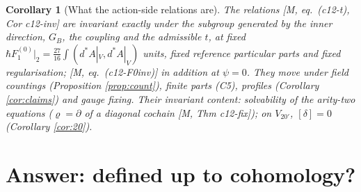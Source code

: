 \documentclass[10pt]{article}
\newtheorem{corollary}[theorem]{Corollary}
\theoremstyle{definition}
\begin{document}
\begin{corollary}[What the action-side relations are]\label{cor:act}
The relations [M, eq.~(c12-t), Cor c12-inv] are invariant exactly under the subgroup generated by the inner direction, $G_B$, the coupling and the admissible $t$, at fixed $\hbar F_1^{(0)}|_2=\tfrac{27}{16}\int(d^*A|_V,d^*A|_V)$ units, fixed reference particular parts and fixed regularisation; [M, eq.~(c12-F0inv)] in addition at $\psi=0$. They move under field countings (Proposition \ref{prop:count}), finite parts (C5), profiles (Corollary \ref{cor:claims}) and gauge fixing. Their invariant content: solvability of the arity-two equations ($\varrho=\partial$ of a diagonal cochain [M, Thm c12-fix]); on $V_{20'}$, $[\delta]=0$ (Corollary \ref{cor:20}).
\end{corollary}

\section{Answer: defined up to cohomology?}
\end{document}
